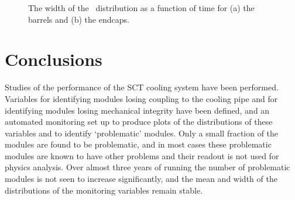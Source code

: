 \begin{figure}[h]
 	\centering
  \caption[The width of the \tdiff\ distribution as a function of time.]
  {The width of the \tdiff\ distribution as a function of time for (a)
  the barrels and (b) the endcaps.}
	\label{fig:sigma-evo-tavg}
\end{figure}

\section{Conclusions}

Studies of the performance of the SCT cooling system have been performed. 
Variables for identifying modules
losing coupling to the cooling pipe and for identifying modules losing
mechanical integrity have been defined, and an automated monitoring set up to
produce plots of the distributions of these variables and to
identify `problematic' modules. Only a small fraction of the modules are found
to be problematic, and in  most cases these problematic modules are known to have other
problems and their readout is not used for physics analysis. Over almost three years of
running the number of problematic modules is not seen to increase significantly,
and the mean and width of the distributions of the monitoring variables remain
stable.

